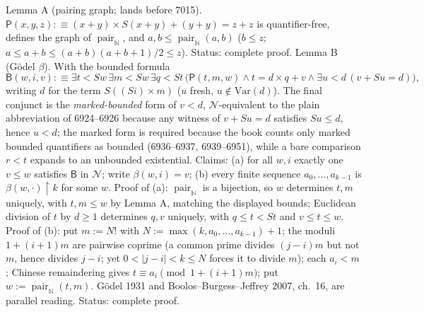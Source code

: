 Lemma A (pairing graph; lands before 7015).  \(\mathsf{P}(x,y,z):\equiv(x+y)\times S(x+y)+(y+y)=z+z\) is quantifier-free, defines the graph of \(\operatorname{pair}_{\mathbb N}\), and \(a,b\le\operatorname{pair}_{\mathbb N}(a,b)\) (\(b\le z\); \(a\le a+b\le(a+b)(a+b+1)/2\le z\)).  Status: complete proof.  Lemma B (G\"odel \(\beta\)).  With the bounded formula
\[
  \mathsf{B}(w,i,v):\equiv\exists t<Sw\,\exists m<Sw\,\exists q<St\,
  \bigl(\mathsf{P}(t,m,w)\land t=d\times q+v\land\exists u<d\,(v+Su=d)\bigr),
\]
writing \(d\) for the term \(S((Si)\times m)\) (\(u\) fresh, \(u\notin\mathrm{Var}(d)\)).  The final conjunct is the \emph{marked-bounded} form of \(v<d\), \(\mathcal N\)-equivalent to the plain abbreviation of 6924--6926 because any witness of \(v+Su=d\) satisfies \(Su\le d\), hence \(u<d\); the marked form is required because the book counts only marked bounded quantifiers as bounded (6936--6937, 6939--6951), while a bare comparison \(r<t\) expands to an unbounded existential.  Claims: (a) for all \(w,i\) exactly one \(v\le w\) satisfies \(\mathsf{B}\) in \(\mathcal N\); write \(\beta(w,i)=v\); (b) every finite sequence \(a_0,\dots,a_{k-1}\) is \(\beta(w,\cdot)\upharpoonright k\) for some \(w\).  Proof of (a): \(\operatorname{pair}_{\mathbb N}\) is a bijection, so \(w\) determines \(t,m\) uniquely, with \(t,m\le w\) by Lemma A, matching the displayed bounds; Euclidean division of \(t\) by \(d\ge1\) determines \(q,v\) uniquely, with \(q\le t<St\) and \(v\le t\le w\).  Proof of (b): put \(m:=N!\) with \(N:=\max(k,a_0,\dots,a_{k-1})+1\); the moduli \(1+(i+1)m\) are pairwise coprime (a common prime divides \((j-i)m\) but not \(m\), hence divides \(j-i\); yet \(0<|j-i|<k\le N\) forces it to divide \(m\)); each \(a_i<m\); Chinese remaindering gives \(t\equiv a_i\pmod{1+(i+1)m}\); put \(w:=\operatorname{pair}_{\mathbb N}(t,m)\).  G\"odel 1931 and Boolos--Burgess--Jeffrey 2007, ch.~16, are parallel reading.  Status: complete proof.

